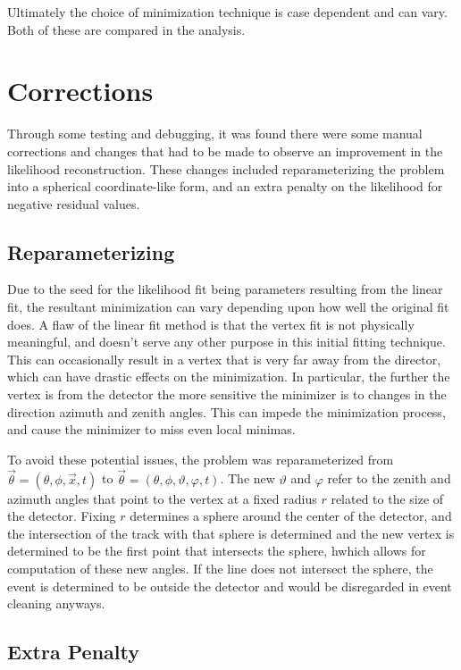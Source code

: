 Ultimately the choice of minimization technique is case dependent and can vary. Both of these are compared in the analysis.

\section{Corrections}

Through some testing and debugging, it was found there were some manual corrections and changes that had to be made to observe an improvement in the likelihood reconstruction. These changes included reparameterizing the problem into a spherical coordinate-like form, and an extra penalty on the likelihood for negative residual values.

\subsection{Reparameterizing}

Due to the seed for the likelihood fit being parameters resulting from the linear fit, the resultant minimization can vary depending upon how well the original fit does. A flaw of the linear fit method is that the vertex fit is not physically meaningful, and doesn't serve any other purpose in this initial fitting technique. This can occasionally result in a vertex that is very far away from the director, which can have drastic effects on the minimization. In particular, the further the vertex is from the detector the more sensitive the minimizer is to changes in the direction azimuth and zenith angles. This can impede the minimization process, and cause the minimizer to miss even local minimas.

To avoid these potential issues, the problem was reparameterized from $\vec{\theta} = (\theta, \phi, \vec{x}, t)$ to $\vec{\theta} = (\theta, \phi, \vartheta, \varphi, t)$. The new $\vartheta$ and $\varphi$ refer to the zenith and azimuth angles that point to the vertex at a fixed radius $r$ related to the size of the detector. Fixing $r$ determines a sphere around the center of the detector, and the intersection of the track with that sphere is determined and the new vertex is determined to be the first point that intersects the sphere, hwhich allows for computation of these new angles. If the line does not intersect the sphere, the event is determined to be outside the detector and would be disregarded in event cleaning anyways. 

\subsection{Extra Penalty}

